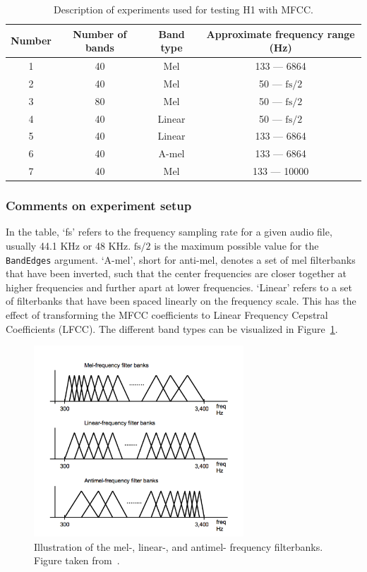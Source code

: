 \begin{table}[h!t]
\begin{center}
\begin{tabular}{c c c c}
\toprule
Number & Number of bands & Band type & Approximate frequency range (Hz) \\ [0.5ex]
\midrule
1 & 40 & Mel & 133 --- 6864 \\
2 & 40 & Mel & 50 --- $\text{fs}/2$ \\
3 & 80 & Mel & 50 --- $\text{fs}/2$ \\
4 & 40 & Linear & 50 --- $\text{fs}/2$ \\
5 & 40 & Linear & 133 --- 6864 \\
6 & 40 & A-mel & 133 --- 6864 \\
7 & 40 & Mel & 133 --- 10000 \\
\bottomrule
\end{tabular}
\caption{Description of experiments used for testing H1 with
MFCC.}\label{table:h1_mfcc_experiments}
\end{center}
\end{table}

\subsubsection{Comments on experiment setup}

In the table, `fs' refers to the frequency sampling rate for a given audio file,
usually 44.1 KHz or 48 KHz. $\text{fs}/2$ is the maximum possible value for the
\texttt{BandEdges} argument. `A-mel', short for anti-mel, denotes a set of mel
filterbanks that have been inverted, such that the center frequencies are closer
together at higher frequencies and further apart at lower frequencies. `Linear'
refers to a set of filterbanks that have been spaced linearly on the frequency
scale. This has the effect of transforming the MFCC coefficients to Linear
Frequency Cepstral Coefficients (LFCC). The different band types can be
visualized in Figure~\ref{fig:filterbanks}.

\begin{figure}[ht]
  \centering
  \includegraphics[width=0.7\textwidth]{figures/filterbanks.png}
  \caption{Illustration of the mel-, linear-, and antimel- frequency
  filterbanks. Figure taken from~\cite{lei2009mel}.}\label{fig:filterbanks}
\end{figure}

